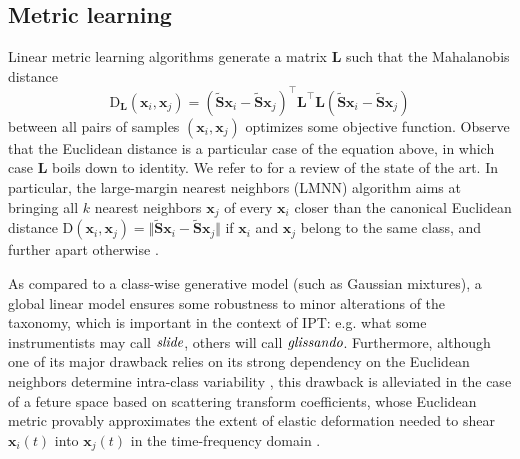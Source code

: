 \documentclass{article}
\makeatletter
\newcommand*{\eg}{e.g.\@\xspace}
\makeatother
\begin{document}
\subsection{Metric learning} %



Linear metric learning algorithms generate a matrix $\mathbf{L}$ such that the Mahalanobis distance
\begin{equation}
\mathrm{D}_\mathbf{L}(\boldsymbol{x}_i, \boldsymbol{x}_j) = (\widetilde{\mathbf{S}}\boldsymbol{x}_i - \widetilde{\mathbf{S}}\boldsymbol{x}_j)^{\top}  \mathbf{L}^{\top} \mathbf{L} (\widetilde{\mathbf{S}}\boldsymbol{x}_i-\widetilde{\mathbf{S}}\boldsymbol{x}_j)
\end{equation}
between all pairs of samples $(\boldsymbol{x}_i, \boldsymbol{x}_j)$ optimizes some objective function.
Observe that the Euclidean distance is a particular case of the equation above, in which case $\mathbf{L}$ boils down to identity.
We refer to \cite{bellet2013survey} for a review of the state of the art.
In particular, the large-margin nearest neighbors (LMNN) algorithm aims at bringing all $k$ nearest neighbors $\boldsymbol{x}_j$ of every $\boldsymbol{x}_i$ closer than the canonical Euclidean distance $\mathrm{D}(\boldsymbol{x}_i, \boldsymbol{x}_j) = \Vert \widetilde{\mathbf{S}}\boldsymbol{x}_i - \widetilde{\mathbf{S}}\boldsymbol{x}_j \Vert$ if $\boldsymbol{x}_i$ and $\boldsymbol{x}_j$ belong to the same class, and further apart otherwise \cite{weinberger2009jmlr}.

As compared to a class-wise generative model (such as Gaussian mixtures), a global linear model ensures some robustness to minor alterations of the taxonomy, which is important in the context of IPT: \eg{} what some instrumentists may call $\emph{slide}$, others will call $\emph{glissando}$.
Furthermore, although one of its major drawback relies on its strong dependency on the Euclidean neighbors determine intra-class variability \cite{mcfee2010icml}, this drawback is alleviated in the case of a feture space based on scattering transform coefficients, whose Euclidean metric provably approximates the extent of elastic deformation needed to shear $\boldsymbol{x}_i(t)$ into $\boldsymbol{x}_j(t)$ in the time-frequency domain \cite[Theorem 2.16]{mallat2012cpam}.
\end{document}
